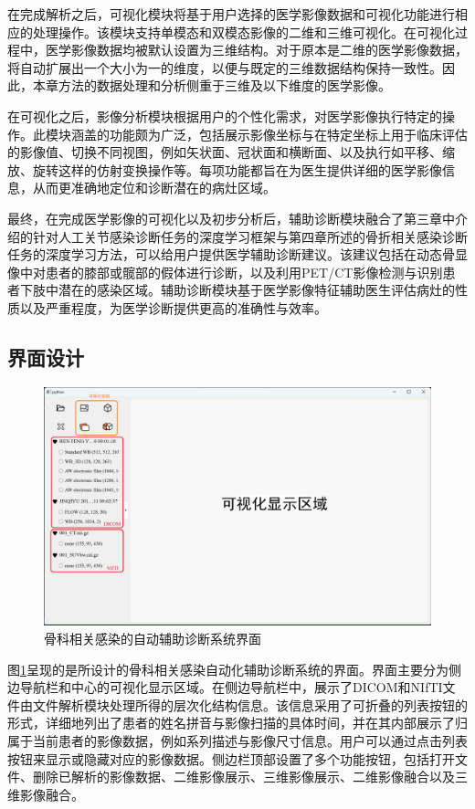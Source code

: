 在完成解析之后，可视化模块将基于用户选择的医学影像数据和可视化功能进行相应的处理操作。该模块支持单模态和双模态影像的二维和三维可视化。在可视化过程中，医学影像数据均被默认设置为三维结构。对于原本是二维的医学影像数据，将自动扩展出一个大小为一的维度，以便与既定的三维数据结构保持一致性。因此，本章方法的数据处理和分析侧重于三维及以下维度的医学影像。

在可视化之后，影像分析模块根据用户的个性化需求，对医学影像执行特定的操作。此模块涵盖的功能颇为广泛，包括展示影像坐标与在特定坐标上用于临床评估的影像值、切换不同视图，例如矢状面、冠状面和横断面、以及执行如平移、缩放、旋转这样的仿射变换操作等。每项功能都旨在为医生提供详细的医学影像信息，从而更准确地定位和诊断潜在的病灶区域。

最终，在完成医学影像的可视化以及初步分析后，辅助诊断模块融合了第三章中介绍的针对人工关节感染诊断任务的深度学习框架与第四章所述的骨折相关感染诊断任务的深度学习方法，可以给用户提供医学辅助诊断建议。该建议包括在动态骨显像中对患者的膝部或髋部的假体进行诊断，以及利用PET/CT影像检测与识别患者下肢中潜在的感染区域。辅助诊断模块基于医学影像特征辅助医生评估病灶的性质以及严重程度，为医学诊断提供更高的准确性与效率。

\subsection{界面设计}

\begin{figure}[htbp]
  \centering
  \includegraphics[width=\textwidth]{figures/chap05_preview.jpg}
  \caption{骨科相关感染的自动辅助诊断系统界面}
  \label{fig:chap05_preview}
\end{figure}

图\ref{fig:chap05_preview}呈现的是所设计的骨科相关感染自动化辅助诊断系统的界面。界面主要分为侧边导航栏和中心的可视化显示区域。在侧边导航栏中，展示了DICOM和NIfTI文件由文件解析模块处理所得的层次化结构信息。该信息采用了可折叠的列表按钮的形式，详细地列出了患者的姓名拼音与影像扫描的具体时间，并在其内部展示了归属于当前患者的影像数据，例如系列描述与影像尺寸信息。用户可以通过点击列表按钮来显示或隐藏对应的影像数据。侧边栏顶部设置了多个功能按钮，包括打开文件、删除已解析的影像数据、二维影像展示、三维影像展示、二维影像融合以及三维影像融合。

